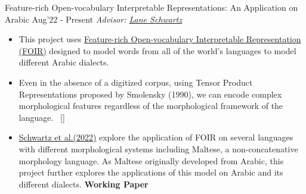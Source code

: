 \begin{projects}
\project
	{Feature-rich Open-vocabulary Interpretable Representations: An Application on Arabic
}{Aug'22 - Present}
	{
	     \textit{Advisor: \href{http://dowobeha.github.io/about/}{Lane Schwartz}}
	}
	{\begin{itemize}
	\setlength\itemsep{0.3em}
     \item This project uses  \href{https://aclanthology.org/2022.fieldmatters-1.8/}{Feature-rich Open-vocabulary Interpretable Representation (FOIR)} designed to model words from all of the world’s languages to model different Arabic dialects. 
     \item Even in the absence of a digitized corpus, using Tensor Product Representations proposed by Smolensky (1990), we can encode complex morphological features regardless of the morphological framework of the language.~ [\href{https://github.com/neural-polysynthetic-language-modelling/iiksiin}{\small{\websiteSymbol}}]  ~
     \item{\href{https://aclanthology.org/2022.fieldmatters-1.8/}{Schwartz et al.(2022)} explore the application of FOIR on several languages with different morphological systems including Maltese, a non-concatenative morphology language. As Maltese originally developed from Arabic, this project further explores the applications of this model on Arabic and its different dialects.}  {\small{\lbrack\textbf{{Working Paper}}\rbrack} }
     \end{itemize}}



\end{projects}
